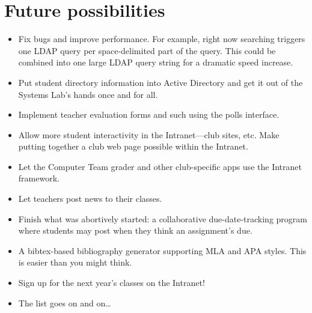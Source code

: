 \documentclass[11pt,letterpaper]{report}
\begin{document}
\section{Future possibilities}
\begin{itemize}
	\item Fix bugs and improve performance.  For example, right now
		searching triggers one LDAP query per space-delimited
		part of the query.  This could be combined into one
		large LDAP query string for a dramatic speed increase.
	\item Put student directory information into Active Directory
		and get it out of the Systems Lab's hands once and for all.
	\item Implement teacher evaluation forms and such using the polls
		interface.
	\item Allow more student interactivity in the Intranet---club sites,
		etc.  Make putting together a club web page possible within
		the Intranet.
	\item Let the Computer Team grader and other club-specific apps use
		the Intranet framework.
	\item Let teachers post news to their classes.
	\item Finish what was abortively started: a collaborative due-date-tracking
		program where students may post when they think an assignment's due.
	\item A bibtex-based bibliography generator supporting MLA and APA styles.
		This is easier than you might think.
	\item Sign up for the next year's classes on the Intranet!
	\item The list goes on and on\ldots
\end{itemize}
\end{document}
